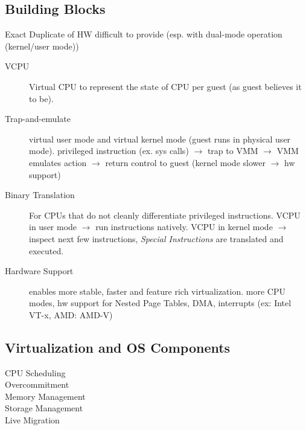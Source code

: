 \subsection*{Building Blocks}
Exact Duplicate of HW difficult to provide (esp. with dual-mode operation (kernel/user mode))
\begin{description}
    \item[VCPU]Virtual CPU to represent the state of CPU per guest (as guest believes it to be).  %
    \item[Trap-and-emulate] virtual user mode and virtual kernel mode (guest runs in physical user mode). privileged instruction (ex. sys calls) $\rightarrow$ trap to VMM $\rightarrow$ VMM emulates action $\rightarrow$ return control to guest (kernel mode slower $\rightarrow$ hw support)
    \item[Binary Translation] For CPUs that do not cleanly differentiate privileged instructions. VCPU in user mode $\rightarrow$  run instructions natively. VCPU in kernel mode $\rightarrow$ inspect next few instructions, \textit{Special Instructions} are translated and executed.
    \item[Hardware Support]enables more stable, faster and feature rich virtualization. more CPU modes, hw support for Nested Page Tables, DMA, interrupts (ex: Intel VT-x, AMD: AMD-V)
\end{description}
\subsection*{Virtualization and OS Components}
\begin{description}
    \item[CPU Scheduling]
    \item[Overcommitment]
    \item[Memory Management]
    \item[Storage Management]
    \item[Live Migration]
\end{description}
